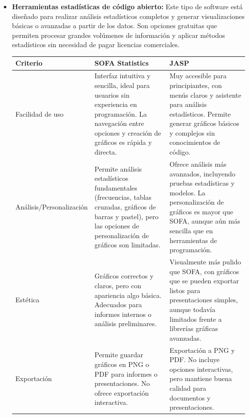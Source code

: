 \documentclass{../../miPlantilla}
\begin{document}
\begin{itemize}
    \item \textbf{Herramientas estadísticas de código abierto:}  
    Este tipo de software está diseñado para realizar análisis estadísticos completos y generar visualizaciones básicas o
    avanzadas a partir de los datos. Son opciones gratuitas que permiten procesar grandes volúmenes de información y aplicar
    métodos estadísticos sin necesidad de pagar licencias comerciales.

    \begin{table}[H]
        \centering
        \scriptsize %
        \setlength{\tabcolsep}{4pt} %
        \renewcommand{\arraystretch}{1.3} %
        \begin{tabularx}{\textwidth}{
            >{\centering\arraybackslash}X
            >{\centering\arraybackslash}X
            >{\centering\arraybackslash}X
        }
            \toprule
            \rowcolor[HTML]{C0C0C0}
            \textbf{Criterio} & \textbf{SOFA Statistics} & \textbf{JASP} \\ \midrule
            Facilidad de uso & Interfaz intuitiva y sencilla, ideal para usuarios sin experiencia en programación. La navegación entre opciones y creación de gráficos es rápida y directa. & Muy accesible para principiantes, con menús claros y asistente para análisis estadísticos. Permite generar gráficos básicos y complejos sin conocimientos de código. \\
            \midrule
            Análisis/Personalización & Permite análisis estadísticos fundamentales (frecuencias, tablas cruzadas, gráficos de barras y pastel), pero las opciones de personalización de gráficos son limitadas. & Ofrece análisis más avanzados, incluyendo pruebas estadísticas y modelos. La personalización de gráficos es mayor que SOFA, aunque aún más sencilla que en herramientas de programación. \\
            \midrule
            Estética & Gráficos correctos y claros, pero con apariencia algo básica. Adecuados para informes internos o análisis preliminares. & Visualmente más pulido que SOFA, con gráficos que se pueden exportar listos para presentaciones simples, aunque todavía limitados frente a librerías gráficas avanzadas. \\
            \midrule
            Exportación & Permite guardar gráficos en PNG o PDF para informes o presentaciones. No ofrece exportación interactiva. & Exportación a PNG y PDF. No incluye opciones interactivas, pero mantiene buena calidad para documentos y presentaciones. \\

\end{tabularx}
\end{table}
\end{itemize}
\end{document}
